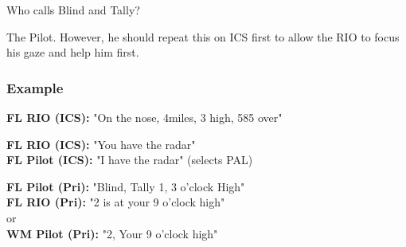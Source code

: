 Who calls Blind and Tally?

The Pilot. However, he should repeat this on ICS first to allow the RIO to
focus his gaze and help him first.

\subsubsection*{Example}


\textbf{FL RIO (ICS):} "On the nose, 4miles, 3 high, 585 over"

\textbf{FL RIO (ICS):} "You have the radar"\\
\textbf{FL Pilot (ICS):} "I have the radar" (selects PAL)

\textbf{FL Pilot (Pri):} "Blind, Tally 1, 3 o'clock High"\\
\textbf{FL RIO (Pri):} "2 is at your 9 o'clock high" \\
or \\
\textbf{WM Pilot (Pri):} "2, Your 9 o'clock high"
